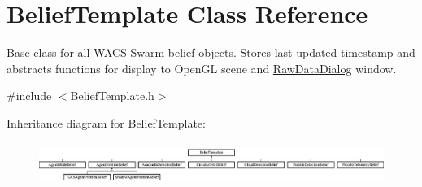 \hypertarget{class_belief_template}{
\section{BeliefTemplate Class Reference}
\label{class_belief_template}
}


Base class for all WACS Swarm belief objects. Stores last updated timestamp and abstracts functions for display to OpenGL scene and \hyperlink{class_raw_data_dialog}{RawDataDialog} window.  




{\ttfamily \#include $<$BeliefTemplate.h$>$}

Inheritance diagram for BeliefTemplate:\begin{figure}[H]
\begin{center}
\leavevmode
\includegraphics[height=1.379310cm]{class_belief_template}
\end{center}
\end{figure}
